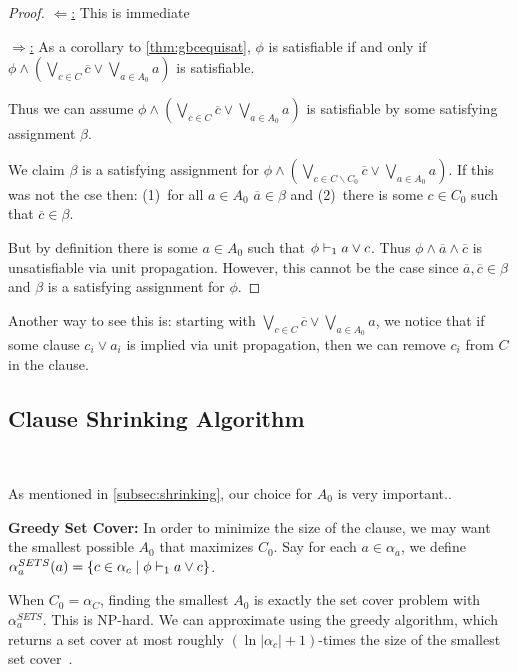 \begin{proof}
    \underline{$\Leftarrow$:} This is immediate


    \underline{$\Rightarrow$:}  As a corollary to \autoref{thm:gbcequisat}, $\phi$ is satisfiable if and only if $\phi \land (\bigvee_{c \in C} \overline{c} \lor \bigvee_{a \in A_0} a)$ is satisfiable.

    Thus we can assume $\phi \land (\bigvee_{c \in C} \overline{c} \lor \bigvee_{a \in A_0} a)$ is satisfiable by some satisfying assignment $\beta$.

    We claim $\beta$ is a satisfying assignment for $\phi \land (\bigvee_{c \in C \backslash C_0} \overline{c} \lor \bigvee_{a \in A_0} a)$. If this was not the cse then: (1)~for all $a \in A_0$ $\overline{a} \in \beta$ and (2)~there is some $c \in C_0$ such that $\overline{c} \in \beta$. 

    But by definition there is some $a \in A_0$ such that $\phi \vdash_1 a \lor c$. Thus $\phi \land \overline{a} \land \overline{c}$ is unsatisfiable via unit propagation. However, this cannot be the case since $\overline{a}, \overline{c} \in \beta$ and $\beta$ is a satisfying assignment for $\phi$.
\end{proof}

Another way to see this is: starting with $\bigvee_{c \in C} \overline{c} \lor \bigvee_{a \in A_0} a$, we notice that if some clause $c_i \lor a_i$ is implied via unit propagation, then we can remove $c_i$ from $C$ in the clause.

\subsection{Clause Shrinking Algorithm}~\label{subsec:sym}

As mentioned in \autoref{subsec:shrinking}, our choice for $A_0$ is very important.. 


\noindent \textbf{Greedy Set Cover:} %
In order to minimize the size of the clause, we may want the smallest possible $A_0$ that maximizes $C_0$. Say for each $a \in \alpha_a$, we define $\alpha_a^{SETS}(a) = \{ c \in \alpha_c \; | \; \phi \vdash_1 a \lor c\}$. 

When $C_0 = \alpha_C$, finding the smallest $A_0$ is exactly the set cover problem with $\alpha_a^{SETS}$. This is NP-hard. We can approximate using the greedy algorithm, which returns a set cover at most roughly $(\ln |\alpha_c| + 1)$-times the size of the smallest set cover~\cite{greedysetcover}. 


